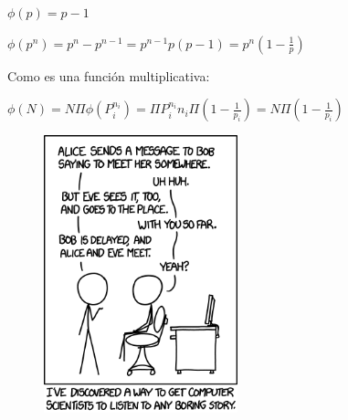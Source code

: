 				$\phi(p) = p-1$

				$\phi(p^n) = p^{n} - p^{n-1} = p^{n-1} p(p-1) = p^{n}(1- \frac{1}{p})$

				Como es una función multiplicativa:

				$\phi(N) =N \Pi \phi(P_i^{n_i}) = \Pi P_i^{n_i} n_i \Pi (1- \frac{1}{p_i}) = N \Pi(1 - \frac{1}{p_i})$









\begin{figure}[h]
	\begin{center}
		\includegraphics[width=0.5\textwidth]{img/protocol.png}
	\end{center}
\end{figure}



